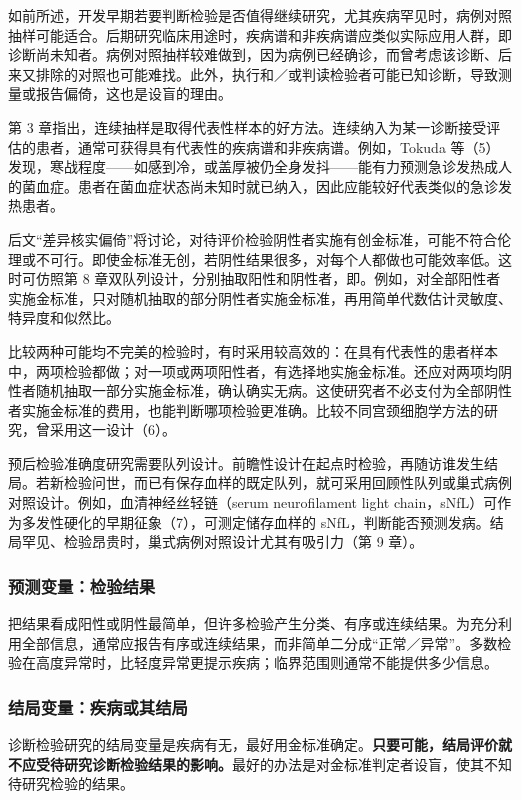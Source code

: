 如前所述，开发早期若要判断检验是否值得继续研究，尤其疾病罕见时，病例对照抽样可能适合。后期研究临床用途时，疾病谱和非疾病谱应类似实际应用人群，即诊断尚未知者。病例对照抽样较难做到，因为病例已经确诊，而曾考虑该诊断、后来又排除的对照也可能难找。此外，执行和／或判读检验者可能已知诊断，导致测量或报告偏倚，这也是设盲的理由。

第 3 章指出，连续抽样是取得代表性样本的好方法。连续纳入为某一诊断接受评估的患者，通常可获得具有代表性的疾病谱和非疾病谱。例如，Tokuda 等（5）发现，寒战程度——如感到冷，或盖厚被仍全身发抖——能有力预测急诊发热成人的菌血症。患者在菌血症状态尚未知时就已纳入，因此应能较好代表类似的急诊发热患者。

后文“差异核实偏倚”将讨论，对待评价检验阴性者实施有创金标准，可能不符合伦理或不可行。即使金标准无创，若阴性结果很多，对每个人都做也可能效率低。这时可仿照第 8 章双队列设计，分别抽取阳性和阴性者，即。例如，对全部阳性者实施金标准，只对随机抽取的部分阴性者实施金标准，再用简单代数估计灵敏度、特异度和似然比。

比较两种可能均不完美的检验时，有时采用较高效的：在具有代表性的患者样本中，两项检验都做；对一项或两项阳性者，有选择地实施金标准。还应对两项均阴性者随机抽取一部分实施金标准，确认确实无病。这使研究者不必支付为全部阴性者实施金标准的费用，也能判断哪项检验更准确。比较不同宫颈细胞学方法的研究，曾采用这一设计（6）。

预后检验准确度研究需要队列设计。前瞻性设计在起点时检验，再随访谁发生结局。若新检验问世，而已有保存血样的既定队列，就可采用回顾性队列或巢式病例对照设计。例如，血清神经丝轻链（serum neurofilament light chain，sNfL）可作为多发性硬化的早期征象（7），可测定储存血样的 sNfL，判断能否预测发病。结局罕见、检验昂贵时，巢式病例对照设计尤其有吸引力（第 9 章）。

\subsubsection{预测变量：检验结果}
把结果看成阳性或阴性最简单，但许多检验产生分类、有序或连续结果。为充分利用全部信息，通常应报告有序或连续结果，而非简单二分成“正常／异常”。多数检验在高度异常时，比轻度异常更提示疾病；临界范围则通常不能提供多少信息。

\subsubsection{结局变量：疾病或其结局}
诊断检验研究的结局变量是疾病有无，最好用金标准确定。\textbf{只要可能，结局评价就不应受待研究诊断检验结果的影响。}最好的办法是对金标准判定者设盲，使其不知待研究检验的结果。

